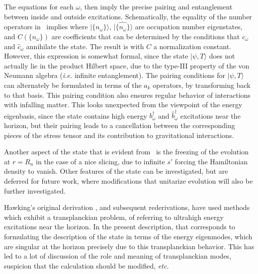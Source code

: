 The equations
%
\eqn{}
%
for each $\omega$, then imply the precise pairing and entanglement between inside and outside excitations.  Schematically, 
the equality of the number operators in \pairing\ implies
%
\eqn{}
%
where $ |\{n_\omega\}\rangle$, $ |\widehat{\{n_\omega\}}\rangle$ are occupation number eigenstates, and $C\left(\{n_\omega\}\right)$ are coefficients   that can be determined by the conditions that $c_\omega$ and $\hat c_\omega$ annihilate the state.  The result is 
%
\eqn{}
%
with $C$ a normalization constant.
However, this expression is somewhat formal, since the state $|\psi,T\rangle$ does not actually lie in the product Hilbert space, due to the type-III property of the von Neumann algebra ({\it i.e.} infinite entanglement). 
The pairing conditions for  $|\psi,T\rangle$ can alternately be formulated in terms of the $a_k$ operators, by transforming back to that basis.  This pairing condition also ensures regular behavior of interactions with infalling matter.  This looks unexpected from the viewpoint of the energy eigenbasis, since the state contains high energy $b^\dagger_\omega$ and $\hat b^\dagger_\omega$ excitations near the horizon, but their pairing leads to a cancellation between the corresponding pieces of the stress tensor and its contribution to gravitational interactions.

Another aspect of the state that is evident from \hamr\ is the freezing of the evolution at $r=R_n$ in the case of a nice slicing, due to infinite $s'$ forcing the Hamiltonian density to vanish.  Other features of the state can be investigated, but are deferred for future work, where modifications that unitarize evolution will also be further investigated.


Hawking's original derivation , and subsequent rederivations, have used methods which exhibit a transplanckian problem, of referring to ultrahigh energy excitations near the horizon.  In the present description, that corresponds to formulating the description of the state in terms of the energy eigenmodes, which are singular at the horizon precisely due to this transplanckian behavior.  This has led to a lot of discussion of the role and meaning of transplanckian modes, suspicion that the calculation should be modified, {\it etc.}  

